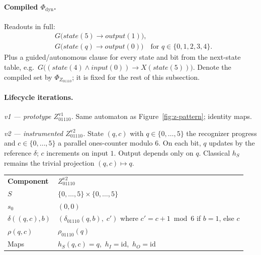 \paragraph{Compiled $\Phi_{\mathrm{dyn}}$.}
Readouts in full:
\begin{align*}
  &G\bigl(\mathit{state}(5) \rightarrow \mathit{output}(1)\bigr), \\
  &G\bigl(\mathit{state}(q) \rightarrow \mathit{output}(0)\bigr)
    \quad\text{for } q\in\{0,1,2,3,4\}.
\end{align*}
Plus a guided/autonomous clause for every state and bit from the next-state table, e.g.\
$G\bigl((\mathit{state}(4)\wedge\mathit{input}(0)) \rightarrow X(\mathit{state}(5))\bigr)$.
Denote the compiled set by $\Phi_{Z_{01110}}$; it is fixed for the rest of this subsection.

\paragraph{Lifecycle iterations.}

\textit{v1 --- prototype $Z_{01110}^{\mathrm{v1}}$.}
Same automaton as Figure~\ref{fig:z-pattern}; identity maps.

\textit{v2 --- instrumented $Z_{01110}^{\mathrm{v2}}$.}
State $(q,c)$ with $q\in\{0,\ldots,5\}$ the recognizer progress and $c\in\{0,\ldots,5\}$ a parallel ones-counter modulo $6$. On each bit, $q$ updates by the reference $\delta$; $c$ increments on input $1$. Output depends only on $q$. Classical $h_S$ remains the trivial projection $(q,c)\mapsto q$.

\begingroup
\renewcommand{\arraystretch}{1.2}
\footnotesize
\begin{center}
\begin{tabularx}{0.78\linewidth}{@{}>{\raggedright\arraybackslash}p{2.8cm}Y@{}}
    \rowcolor{tableheader}
    \headingfont\bfseries Component & \headingfont\bfseries $Z_{01110}^{\mathrm{v2}}$ \\
    \addlinespace[2pt]
    $S$ & $\{0,\ldots,5\}\times\{0,\ldots,5\}$ \\
    \addlinespace[2pt]
    $s_0$ & $(0,0)$ \\
    \addlinespace[2pt]
    $\delta((q,c),b)$ & $(\delta_{01110}(q,b),\; c')$ where $c'=c{+}1\bmod 6$ if $b{=}1$, else $c$ \\
    \addlinespace[2pt]
    $\rho(q,c)$ & $\rho_{01110}(q)$ \\
    \addlinespace[2pt]
    Maps & $h_S(q,c)=q$,\ $h_I=\mathrm{id}$,\ $h_O=\mathrm{id}$ \\
\end{tabularx}
\end{center}
\label{tab:z-pattern-med}
\endgroup
\vspace{4pt}

